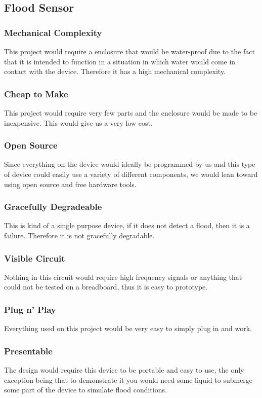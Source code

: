 \documentclass{article}
\begin{document}
\subsection{Flood Sensor}
\subsubsection {Mechanical Complexity}
This project would require a enclosure that would be water-proof due to the
fact that it is intended to function in a situation in which water would come
in contact with the device. Therefore it has a high mechanical complexity.
\subsubsection{Cheap to Make}
This project would require very few parts and the enclosure would be made to be
inexpensive. This would give us a very low cost.
\subsubsection{Open Source}
Since everything on the device would ideally be programmed by us and this type
of device could easily use a variety of different components, we would lean
toward using open source and free hardware tools.
\subsubsection{Gracefully Degradeable}
This is kind of a single purpose device, if it does not detect a flood, then
it is a failure. Therefore it is not gracefully degradable.
\subsubsection{Visible Circuit}
Nothing in this circuit would require high frequency signals or anything that 
could not be tested on a breadboard, thus it is easy to prototype.
\subsubsection{Plug n' Play}
Everything used on this project would be very easy to simply plug in and work.
\subsubsection{Presentable}
The design would require this device to be portable and easy to use, the only
exception being that to demonstrate it you would need some liquid to submerge 
some part of the device to simulate flood conditions.
\end{document}
